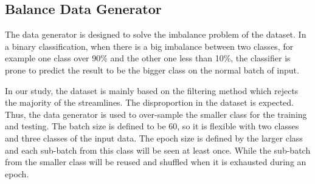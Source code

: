 \subsection{Balance Data Generator}

The data generator is designed to solve the imbalance problem of the dataset. In a binary classification, 
when there is a big imbalance between two classes, for example one class over 90\% and the other one less than 10\%,
the classifier is prone to predict the result to be the bigger class on the normal batch of input. 

In our study, the dataset is mainly based on the filtering method which rejects the majority of the streamlines. 
The disproportion in the dataset is expected. Thus, the data generator is used to over-sample the smaller class for the training and testing.
The batch size is defined to be 60, so it is flexible with two classes and three classes of the input data. 
The epoch size is defined by the larger class and each sub-batch from this class will be seen at least once.
While the sub-batch from the smaller class will be reused and shuffled when it is exhausted during an epoch.









